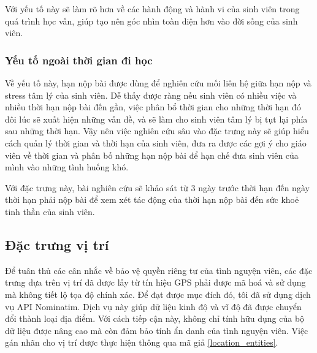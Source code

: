 Với yếu tố này sẽ làm rõ hơn về các hành động và hành vi của sinh viên trong quá trình học vấn, giúp tạo nên góc nhìn toàn diện hơn vào đời sống của sinh viên.

\subsubsection{Yếu tố ngoài thời gian đi học}
Về yếu tố này, hạn nộp bài được dùng để nghiên cứu mối liên hệ giữa hạn nộp và stress tâm lý của sinh viên. Dễ thấy được ràng nếu sinh viên có nhiều việc và nhiều thời hạn nộp bài đến gần, việc phân bổ thời gian cho những thời hạn đó đôi lúc sẽ xuất hiện những vấn đề, và sẽ làm cho sinh viên tâm lý bị tụt lại phía sau những thời hạn. Vậy nên việc nghiên cứu sâu vào đặc trưng này sẽ giúp hiểu cách quản lý thời gian và thời hạn của sinh viên, đưa ra được các gợi ý cho giáo viên về thời gian và phân bố những hạn nộp bài để hạn chế đưa sinh viên của mình vào những tình huống khó.

Với đặc trưng này, bài nghiên cứu sẽ khảo sát từ 3 ngày trước thời hạn đến ngày thời hạn phải nộp bài để xem xét tác động của thời hạn nộp bài đến sức khoẻ tinh thần của sinh viên.

\subsection{Đặc trưng vị trí}\label{location_feat}
Để tuân thủ các cân nhắc về bảo vệ quyền riêng tư của tình nguyện viên, các đặc trưng dựa trên vị trí đã được lấy từ tín hiệu GPS phải được mã hoá và sử dụng mà không tiết lộ tọa độ chính xác. Để đạt được mục đích đó, tôi đã sử dụng dịch vụ API Nominatim. Dịch vụ này giúp dữ liệu kinh độ và vĩ độ đã được chuyển đổi thành loại địa điểm. Với cách tiếp cận này, không chỉ tính hữu dụng của bộ dữ liệu được nâng cao mà còn đảm bảo tính ẩn danh của tình nguyện viên. Việc gán nhãn cho vị trí được thực hiện thông qua mã giả \ref{location_entities}.


